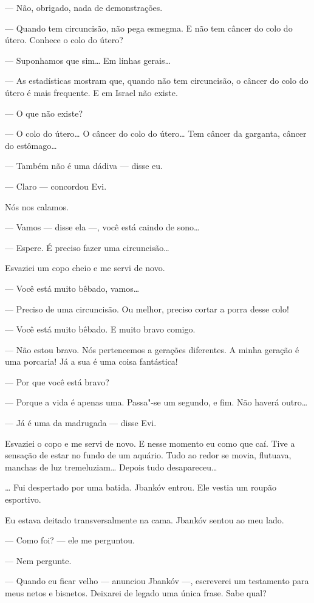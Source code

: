 --- Não, obrigado, nada de demonstrações.

--- Quando tem circuncisão, não pega esmegma. E não tem câncer do
colo do útero. Conhece o colo do útero?

--- Suponhamos que sim\ldots{} Em linhas gerais\ldots{}

--- As estadísticas mostram que, quando não tem circuncisão, o
câncer do colo do útero é mais frequente. E em Israel não existe.

--- O que não existe?

--- O colo do útero\ldots{} O câncer do colo do útero\ldots{} Tem câncer da
garganta, câncer do estômago\ldots{}

--- Também não é uma dádiva --- disse eu.

--- Claro --- concordou Evi.

Nós nos calamos.

--- Vamos --- disse ela ---, você está caindo de
sono\ldots{}

--- Espere. É preciso fazer uma circuncisão\ldots{}

Esvaziei um copo cheio e me servi de novo.

--- Você está muito bêbado, vamos\ldots{}

--- Preciso de uma circuncisão. Ou melhor, preciso cortar a porra
desse colo!

--- Você está muito bêbado. E muito bravo comigo.

--- Não estou bravo. Nós pertencemos a gerações diferentes. A
minha geração é uma porcaria! Já a sua é uma coisa fantástica!

--- Por que você está bravo?

--- Porque a vida é apenas uma. Passa"-se um segundo, e fim. Não
haverá outro\ldots{}

--- Já é uma da madrugada --- disse Evi.

Esvaziei o copo e me servi de novo. E nesse momento eu como que caí.
Tive a sensação de estar no fundo de um aquário. Tudo ao redor se movia,
flutuava, manchas de luz tremeluziam\ldots{} Depois tudo desapareceu\ldots{}

\ldots{} Fui despertado por uma batida. Jbankóv entrou. Ele vestia um roupão
esportivo.

Eu estava deitado transversalmente na cama. Jbankóv sentou ao meu lado.

--- Como foi? --- ele me perguntou.

--- Nem pergunte.

--- Quando eu ficar velho --- anunciou Jbankóv ---,
escreverei um testamento para meus netos e bisnetos. Deixarei de legado
uma única frase. Sabe qual?

